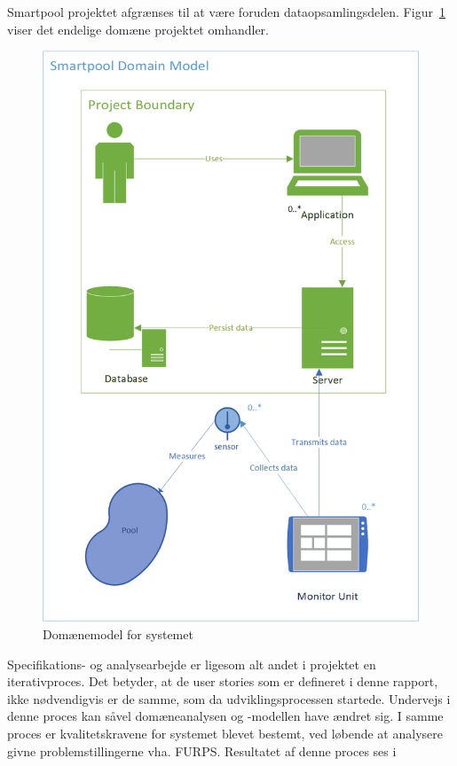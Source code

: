 Smartpool projektet afgrænses til at være foruden dataopsamlingsdelen. Figur~\ref{fig:domainmodelboundary} viser det endelige domæne projektet omhandler.

\begin{figure}
	\centering
	\includegraphics[width=0.7\linewidth]{figs/ProjectBoundary}
	\caption{Domænemodel for systemet}
	\label{fig:domainmodelboundary}
\end{figure}

Specifikations- og analysearbejde er ligesom alt andet i projektet en iterativproces. Det betyder, at de user stories som er defineret i denne rapport, ikke nødvendigvis er de samme, som da udviklingsprocessen startede. Undervejs i denne proces kan såvel domæneanalysen og -modellen have ændret sig. I samme proces er kvalitetskravene for systemet blevet bestemt, ved løbende at analysere givne problemstillingerne vha. FURPS. Resultatet af denne proces ses i  